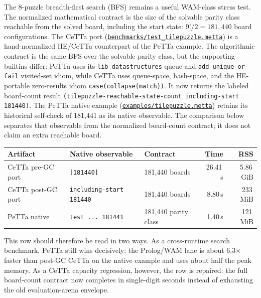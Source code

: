 \documentclass[11pt]{article}
\newcommand{\code}[1]{\texttt{#1}}
\newcommand{\PeTTa}{\textup{PeTTa}}
\newcommand{\HE}{\textup{HE}}
\newcommand{\CeTTa}{\textup{CeTTa}}
\begin{document}
The 8-puzzle breadth-first search (BFS) remains a useful WAM-class
stress test.  The normalized mathematical contract is the size of the
solvable parity class reachable from the solved board, including the
start state: $9!/2 = 181{,}440$ board configurations.  The \CeTTa{} port
(\href{https://github.com/zariuq/CeTTa/blob/9237afd/benchmarks/test_tilepuzzle.metta}{\code{benchmarks/test\_tilepuzzle.metta}})
is a hand-normalized \HE{}/\CeTTa{} counterpart of the \PeTTa{} example.
The algorithmic contract is the same BFS over the solvable parity class,
but the supporting builtins differ: \PeTTa{} uses its
\code{lib\_datastructures} queue and \code{add-unique-or-fail}
visited-set idiom, while \CeTTa{} uses queue-space, hash-space, and the
\HE{}-portable zero-results idiom \code{case(collapse(match))}.  It now
returns the labeled board-count result
\code{(tilepuzzle-reachable-state-count including-start 181440)}.  The
\PeTTa{} native example
(\href{https://github.com/patham9/PeTTa/blob/main/examples/tilepuzzle.metta}{\code{examples/tilepuzzle.metta}})
retains its historical self-check of 181{,}441 as its native observable.
The comparison below separates that observable from the normalized
board-count contract; it does not claim an extra reachable board.

\begin{center}
\small
\begin{tabular}{@{}lllrr@{}}
\toprule
Artifact & Native observable & Contract & Time & RSS \\
\midrule
\CeTTa{} pre-GC port & \code{[181440]} & 181{,}440 boards & 26.41\,s & 5.86\,GiB \\
\CeTTa{} post-GC port & \code{including-start 181440} & 181{,}440 boards & 8.80\,s & 233\,MiB \\
\PeTTa{} native & \code{test ... 181441} & 181{,}440 parity class & 1.40\,s & 121\,MiB \\
\bottomrule
\end{tabular}
\end{center}

This row should therefore be read in two ways.  As a cross-runtime
search benchmark, \PeTTa{} still wins decisively: the Prolog/WAM lane is
about 6.3$\times$ faster than post-GC \CeTTa{} on the native example and
uses about half the peak memory.  As a \CeTTa{} capacity regression,
however, the row is repaired: the full board-count contract now
completes in single-digit seconds instead of exhausting the old
evaluation-arena envelope.
\end{document}
